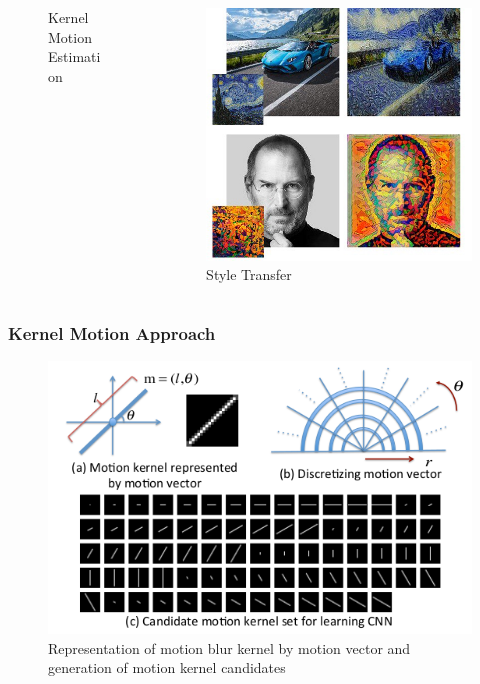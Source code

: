 \documentclass [handout] {beamer}
\begin{document}
\begin{frame}
\begin{columns}
\begin{column}{0.4\textwidth}
\begin{figure}
		\tiny{\caption{Kernel Motion Estimation}}
	\end{figure}
	\end{column}
	\begin{column}{0.4\textwidth}
	\begin{figure}
		\centering
		\includegraphics[width=\columnwidth]{style_transfer_example.png} 
		\tiny{\caption{Style Transfer}}
	\end{figure}
	\end{column}
	\end{columns}
\end{frame}


\begin{frame}
	\frametitle{Kernel Motion Approach}
	\begin{figure}[hptb]
	\centering
	\includegraphics[scale=0.7]{motion_kernel.png} 
	\caption{Representation of motion blur kernel by motion vector
	and generation of motion kernel candidates}
	\label{motion_kernel}
	\end{figure}
\end{frame}
\end{document}
